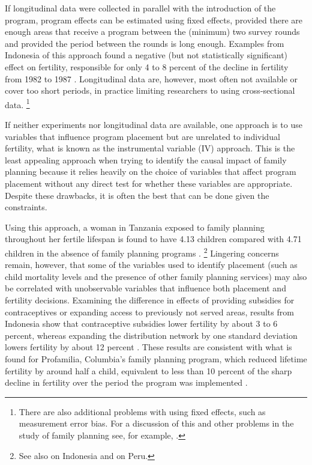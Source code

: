 \documentclass[letterpaper,12pt]{article}
\begin{document}
If longitudinal data were collected in parallel with the introduction of
the program, program effects can be estimated using fixed effects,
provided there are enough areas that receive a program between the
(minimum) two survey rounds and provided the period between the rounds
is long enough.
Examples from Indonesia of this approach found a negative (but not
statistically significant) effect on fertility, responsible for only 4
to 8 percent of the decline in fertility from 1982 to 1987
\citep{pitt93,Gertler1994}.
Longitudinal data are, however, most often not available or cover too
short periods, in practice limiting researchers to using cross-sectional
data.%
\footnote{
There are also additional problems with using fixed effects, such as
measurement error bias.
For a discussion of this and other problems in the study of family
planning see, for example, \cite{angeles98}.}

If neither experiments nor longitudinal data are available, one approach
is to use variables that influence program placement but are unrelated
to individual fertility, what is known as the instrumental variable (IV)
approach.
This is the least appealing approach when trying to identify the causal
impact of family planning because it relies heavily on the choice of
variables that affect program placement without any direct test for
whether these variables are appropriate.
Despite these drawbacks, it is often the best that can be done given the
constraints.

Using this approach, a woman in Tanzania exposed to family planning
throughout her fertile lifespan is found to have 4.13 children compared
with 4.71 children in the absence of family planning programs
\citep{angeles98}.%
\footnote{
See also \citet{Angeles2005} on Indonesia and \citep{Angeles2005a} on
Peru.}
Lingering concerns remain, however, that some of the variables used to
identify placement (such as child mortality levels and the presence of
other family planning services) may also be correlated with unobservable
variables that influence both placement and fertility decisions.
Examining the difference in effects of providing subsidies for
contraceptives or expanding access to previously not served areas,
results from Indonesia show that contraceptive subsidies lower fertility
by about 3 to 6 percent, whereas expanding the distribution network by
one standard deviation lowers fertility by about 12 percent
\citep{Molyneaux2000}.
These results are consistent with what is found for Profamilia,
Columbia's family planning program, which reduced lifetime fertility by
around half a child, equivalent to less than 10 percent of the sharp
decline in fertility over the period the program was implemented
\citep{Miller2010}.
\end{document}
